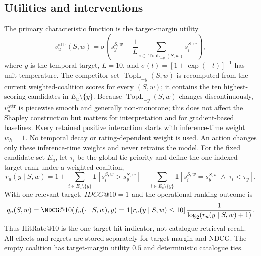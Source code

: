 \documentclass[a4paper,fleqn,doubleblind]{cas-sc}
\begin{document}
\subsection{Utilities and interventions}
The primary characteristic function is the target-margin utility
\begin{equation}
v_u^{\mathrm{attr}}(S,w)=\sigma\left(s_y^{S,w}-\frac{1}{L}\sum_{i\in\operatorname{TopL}_{-y}(S,w)}s_i^{S,w}\right),
\end{equation}
where $y$ is the temporal target, $L=10$, and $\sigma(t)=[1+\exp(-t)]^{-1}$ has unit temperature. The competitor set $\operatorname{TopL}_{-y}(S,w)$ is recomputed from the current weighted-coalition scores for every $(S,w)$; it contains the ten highest-scoring candidates in $E_u\setminus\{y\}$. Because $\operatorname{TopL}_{-y}(S,w)$ changes discontinuously, $v_u^{\mathrm{attr}}$ is piecewise smooth and generally non-monotone; this does not affect the Shapley construction but matters for interpretation and for gradient-based baselines. Every retained positive interaction starts with inference-time weight $w_h=1$. No temporal decay or rating-dependent weight is used. An action changes only these inference-time weights and never retrains the model. For the fixed candidate set $E_u$, let $\tau_i$ be the global tie priority and define the one-indexed target rank under a weighted coalition,
\begin{equation}
r_u(y\mid S,w)=1+\sum_{i\in E_u\setminus\{y\}}\mathbf{1}[s_i^{S,w}>s_y^{S,w}]
+\sum_{i\in E_u\setminus\{y\}}\mathbf{1}[s_i^{S,w}=s_y^{S,w}\ \wedge\ \tau_i<\tau_y].
\end{equation}
With one relevant target, $IDCG@10=1$ and the operational ranking outcome is
\begin{equation}
q_u(S,w)=\NDCG@10(f_u(\cdot\mid S,w),y)=\mathbf{1}[r_u(y\mid S,w)\le10]\,\frac{1}{\log_2(r_u(y\mid S,w)+1)}.
\label{eq:ndcg-one-target}
\end{equation}
Thus HitRate@10 is the one-target hit indicator, not catalogue retrieval recall.
All effects and regrets are stored separately for target margin and NDCG. The empty coalition has target-margin utility $0.5$ and deterministic catalogue ties.
\end{document}
